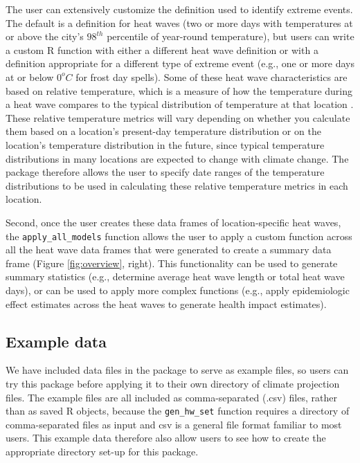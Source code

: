 The user can extensively customize the definition used to identify
extreme events. The default is a definition for heat waves (two or more
days with temperatures at or above the city's \(98^{th}\) percentile of
year-round temperature), but users can write a custom R function with
either a different heat wave definition or with a definition appropriate
for a different type of extreme event (e.g., one or more days at or
below \(0^oC\) for frost day spells). Some of these heat wave
characteristics are based on relative temperature, which is a measure of
how the temperature during a heat wave compares to the typical
distribution of temperature at that location \citep{IPCCch1}. These
relative temperature metrics will vary depending on whether you
calculate them based on a location's present-day temperature
distribution or on the location's temperature distribution in the
future, since typical temperature distributions in many locations are
expected to change with climate change. The package therefore allows the
user to specify date ranges of the temperature distributions to be used
in calculating these relative temperature metrics in each location.

Second, once the user creates these data frames of location-specific
heat waves, the \texttt{apply\_all\_models} function allows the user to
apply a custom function across all the heat wave data frames that were
generated to create a summary data frame (Figure \ref{fig:overview},
right). This functionality can be used to generate summary statistics
(e.g., determine average heat wave length or total heat wave days), or
can be used to apply more complex functions (e.g., apply epidemiologic
effect estimates across the heat waves to generate health impact
estimates).

\subsection{Example data}\label{example-data}

We have included data files in the package to serve as example files, so
users can try this package before applying it to their own directory of
climate projection files. The example files are all included as
comma-separated (.csv) files, rather than as saved R objects, because
the \texttt{gen\_hw\_set} function requires a directory of
comma-separated files as input and csv is a general file format familiar
to most users. This example data therefore also allow users to see how
to create the appropriate directory set-up for this package.

